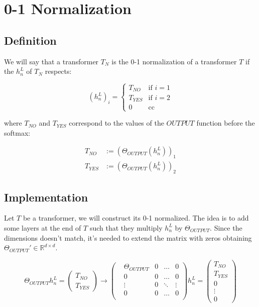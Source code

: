 \section*{0-1 Normalization}

\subsection*{Definition}

We will say that a transformer $T_N$ is the 0-1 normalization of a transformer $T$ if the $h_n^L$ of $T_N$ respects:

\begin{equation*}
(h_{n}^L)_i =
\begin{cases}
T_{NO} & \text{if } i = 1 \\
T_{YES} & \text{if } i = 2 \\
0 & \text{cc }
\end{cases}
\end{equation*}

where $T_{NO}$ and $T_{YES}$ correspond to the values of the $OUTPUT$ function before the softmax:

\begin{align*}
    T_{NO} &:= (\Theta_{OUTPUT}(h_n^L))_1 \\
    T_{YES} &:= (\Theta_{OUTPUT}(h_n^L))_2 
\end{align*}


\subsection*{Implementation}

Let $T$ be a transformer, we will construct its 0-1 normalized. The idea is to add some layers at the end of $T$ such that they multiply $h_n^L$ by $\Theta_{OUTPUT}$. Since the dimensions doesn't match, it's needed to extend the matrix with zeros obtaining $\Theta_{OUTPUT}' \in \mathbb{R}^{d\times d}$.


\begin{equation*}
    \Theta_{OUTPUT}h_n^L =   
    \left(\begin{matrix}
        T_{NO} \\
        T_{YES}
    \end{matrix}\right) \longrightarrow
    \left(\begin{matrix}
        &\Theta_{OUTPUT} &0 &\dots  &0 \\
        &0                &0 &\dots  &0 \\
        &\vdots           &0 &\ddots &\vdots \\
        &0                &0 &\dots  &0 \\
    \end{matrix}\right)h_n^L = 
    \left(\begin{matrix}
        T_{NO} \\
        T_{YES} \\ 
        0 \\
        \vdots \\
        0
    \end{matrix}\right)
\end{equation*}


